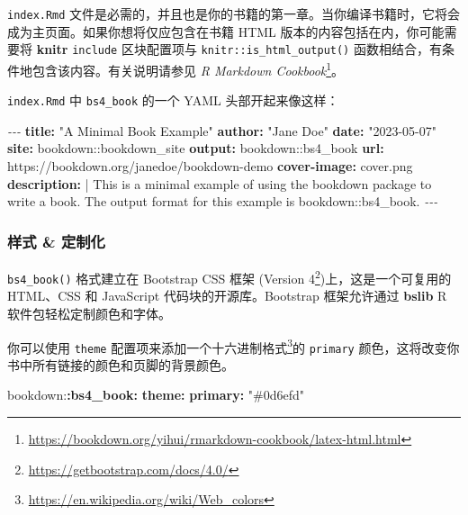 \documentclass[
  12pt,
]{krantz}
\newenvironment{Shaded}{\begin{snugshade}}{\end{snugshade}}
\newcommand{\AttributeTok}[1]{\textcolor[rgb]{0.13,0.29,0.53}{#1}}
\newcommand{\CharTok}[1]{\textcolor[rgb]{0.31,0.60,0.02}{#1}}
\newcommand{\FunctionTok}[1]{\textcolor[rgb]{0.13,0.29,0.53}{\textbf{#1}}}
\newcommand{\KeywordTok}[1]{\textcolor[rgb]{0.13,0.29,0.53}{\textbf{#1}}}
\newcommand{\NormalTok}[1]{#1}
\newcommand{\PreprocessorTok}[1]{\textcolor[rgb]{0.56,0.35,0.01}{\textit{#1}}}
\newcommand{\StringTok}[1]{\textcolor[rgb]{0.31,0.60,0.02}{#1}}
\renewcommand{\href}[2]{#2\footnote{\url{#1}}}
\theoremstyle{definition}
\theoremstyle{definition}
\theoremstyle{definition}
\theoremstyle{definition}
\theoremstyle{remark}
\begin{document}
\texttt{index.Rmd} 文件是必需的，并且也是你的书籍的第一章。当你编译书籍时，它将会成为主页面。如果你想将仅应包含在书籍 HTML 版本的内容包括在内，你可能需要将 \textbf{knitr} \texttt{include} 区块配置项与 \texttt{knitr::is\_html\_output()} 函数相结合，有条件地包含该内容。有关说明请参见 \href{https://bookdown.org/yihui/rmarkdown-cookbook/latex-html.html}{\emph{R Markdown Cookbook}}。

\texttt{index.Rmd} 中 \texttt{bs4\_book} 的一个 YAML 头部开起来像这样：

\begin{Shaded}
\begin{Highlighting}[]
\PreprocessorTok{{-}{-}{-}}
\FunctionTok{title}\KeywordTok{:}\AttributeTok{ }\StringTok{"A Minimal Book Example"}
\FunctionTok{author}\KeywordTok{:}\AttributeTok{ }\StringTok{"Jane Doe"}
\FunctionTok{date}\KeywordTok{:}\AttributeTok{ }\StringTok{"2023{-}05{-}07"}
\FunctionTok{site}\KeywordTok{:}\AttributeTok{ bookdown::bookdown\_site}
\FunctionTok{output}\KeywordTok{:}\AttributeTok{ bookdown::bs4\_book}
\FunctionTok{url}\KeywordTok{:}\AttributeTok{ https://bookdown.org/janedoe/bookdown{-}demo}
\FunctionTok{cover{-}image}\KeywordTok{:}\AttributeTok{ cover.png}
\FunctionTok{description}\KeywordTok{: }\CharTok{|}
\NormalTok{  This is a minimal example of using the bookdown package to write a book.}
\NormalTok{  The output format for this example is bookdown::bs4\_book.}
\PreprocessorTok{{-}{-}{-}}
\end{Highlighting}
\end{Shaded}

\hypertarget{ux6837ux5f0f-ux5b9aux5236ux5316}{%
\subsubsection{样式 \& 定制化}\label{ux6837ux5f0f-ux5b9aux5236ux5316}}

\texttt{bs4\_book()} 格式建立在 Bootstrap CSS 框架 (\href{https://getbootstrap.com/docs/4.0/}{Version 4})上，这是一个可复用的 HTML、CSS 和 JavaScript 代码块的开源库。Bootstrap 框架允许通过 \textbf{bslib} R 软件包轻松定制颜色和字体。

你可以使用 \texttt{theme} 配置项来添加一个\href{https://en.wikipedia.org/wiki/Web_colors}{十六进制格式}的 \texttt{primary} 颜色，这将改变你书中所有链接的颜色和页脚的背景颜色。

\begin{Shaded}
\begin{Highlighting}[]
\AttributeTok{bookdown:}\FunctionTok{:bs4\_book}\KeywordTok{:}
\AttributeTok{  }\FunctionTok{theme}\KeywordTok{:}
\AttributeTok{    }\FunctionTok{primary}\KeywordTok{:}\AttributeTok{ }\StringTok{"\#0d6efd"}\AttributeTok{   }
\end{Highlighting}
\end{Shaded}
\end{document}
